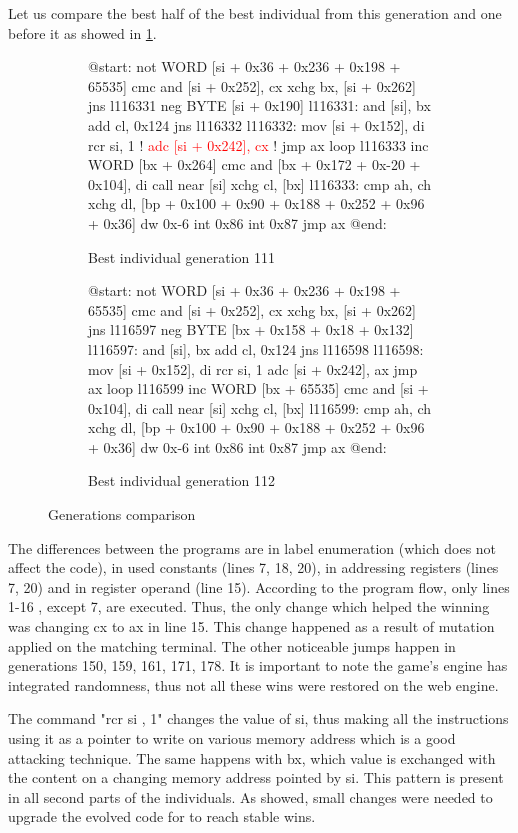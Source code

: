 Let us compare the best half of the best individual from this generation and one before it as showed in \ref{generation_com}.
\begin{figure}
\centering
\begin{subfigure}[t]{0.48\textwidth}
    \begin{assembly}
    @start:
    not WORD [si + 0x36 + 0x236 + 0x198 + 65535]
    cmc
    and [si + 0x252], cx
    xchg bx, [si + 0x262]
    jns l116331
    neg BYTE [si + 0x190]
    l116331:
    and [si], bx
    add cl, 0x124
    jns l116332
    l116332:
    mov [si + 0x152], di
    rcr si, 1
    ! \textcolor{red}{adc [si + 0x242], cx} !
    jmp ax
    loop l116333
    inc WORD [bx + 0x264]
    cmc
    and [bx + 0x172 + 0x-20 + 0x104], di
    call near [si]
    xchg cl, [bx]
    l116333:
    cmp ah, ch
    xchg dl, [bp + 0x100 + 0x90 + 0x188 + 0x252 + 0x96 + 0x36]
    dw 0x-6
    int 0x86
    int 0x87
    jmp ax
    @end:
    \end{assembly}
    \caption{Best individual generation 111}
\end{subfigure}
\hfill
\begin{subfigure}[t]{0.49\textwidth}
    \begin{assembly}
    @start:
    not WORD [si + 0x36 + 0x236 + 0x198 + 65535]
    cmc
    and [si + 0x252], cx
    xchg bx, [si + 0x262]
    jns l116597
    neg BYTE [bx + 0x158 + 0x18 + 0x132]
    l116597:
    and [si], bx
    add cl, 0x124
    jns l116598
    l116598:
    mov [si + 0x152], di
    rcr si, 1
    adc [si + 0x242], ax
    jmp ax
    loop l116599
    inc WORD [bx + 65535]
    cmc
    and [si + 0x104], di
    call near [si]
    xchg cl, [bx]
    l116599:
    cmp ah, ch
    xchg dl, [bp + 0x100 + 0x90 + 0x188 + 0x252 + 0x96 + 0x36]
    dw 0x-6
    int 0x86
    int 0x87
    jmp ax
    @end:
    \end{assembly}
    \caption{Best individual generation 112}
\end{subfigure}
\caption{Generations comparison}
\label{generation_com}
\end{figure}

The differences between the programs are in label enumeration (which does not affect the code), in used constants (lines 7, 18, 20), in addressing registers (lines 7, 20) and in register operand (line 15). According to the program flow, only lines 1-16 , except 7, are executed. Thus, the only change which helped the winning was changing cx to ax in line 15. This change happened as a result of mutation applied on the matching terminal. The other noticeable jumps happen in generations 150, 159, 161, 171, 178. It is important to note the game's engine has integrated randomness, thus not all these wins were restored on the web engine. 

The command "rcr si , 1" changes the value of si, thus making all the instructions using it as a pointer to write on various memory address which is a good attacking technique. The same happens with bx, which value is exchanged with the content on a changing memory address pointed by si. This pattern is present in all second parts of the individuals. 
 As showed, small changes were needed to upgrade the evolved code for to reach stable wins.